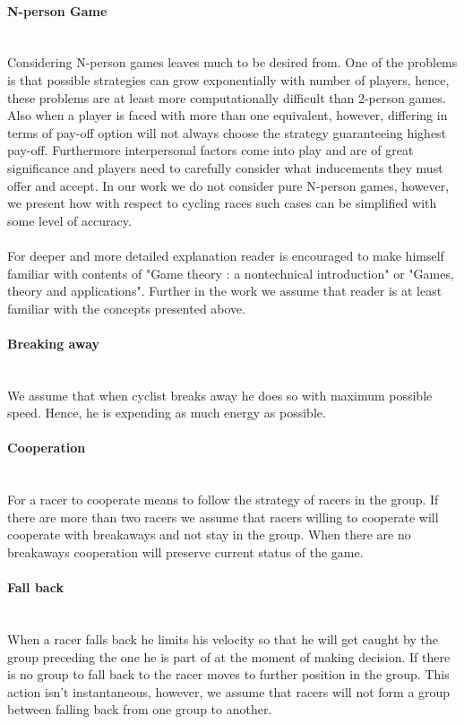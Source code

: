 \documentclass[10pt, a4paper]{report}
\begin{document}
\paragraph{N-person Game} ~\\
Considering N-person games leaves much to be desired from. One of the problems is that possible strategies can grow exponentially with number of players, hence, these problems are at least more computationally difficult than 2-person games. Also when a player is faced with more than one equivalent, however, differing in terms of pay-off option will not always choose the strategy guaranteeing highest pay-off. Furthermore interpersonal factors come into play and are of great significance and players need to carefully consider what inducements they must offer and accept. In our work we do not consider pure N-person games, however, we present how with respect to cycling races such cases can be simplified with some level of accuracy.
\\\\
For deeper and more detailed explanation reader is encouraged to make himself familiar with contents of "Game theory : a nontechnical introduction"\cite{GameTheoryNonTechnical} or "Games, theory and applications"\cite{GameTheoryApplications}. Further in the work we assume that reader is at least familiar with the concepts presented above.

\paragraph{Breaking away} ~\\
We assume that when cyclist breaks away he does so with maximum possible speed. Hence, he is expending as much energy as possible.

\paragraph{Cooperation} ~\\
For a racer to cooperate means to follow the strategy of racers in the group. If there are more than two racers we assume that racers willing to cooperate will cooperate with breakaways and not stay in the group. When there are no breakaways cooperation will preserve current status of the game.

\paragraph{Fall back} ~\\
When a racer falls back he limits his velocity so that he will get caught by the group preceding the one he is part of at the moment of making decision. If there is no group to fall back to the racer moves to further position in the group. This action isn't instantaneous, however, we assume that racers will not form a group between falling back from one group to another.
\end{document}
